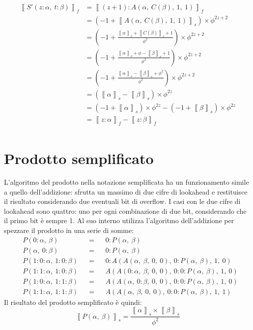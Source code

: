 \documentclass[Lau,oneside]{sapthesis}
\begin{document}
\begin{align*}
\left\llbracket S'(z:\alpha, \ t:\beta) \right\rrbracket_f & = \left\llbracket (z+1):A(\alpha, \ C(\beta), \ 1, \ 1) \right\rrbracket_f\\
& = \left( -1 + \left\llbracket A(\alpha, \ C(\beta), \ 1, \ 1) \right\rrbracket_s \right) \times \phi^{2z+2}\\
& = \left( -1 + \frac{\left\llbracket \alpha \right\rrbracket_s + \left\llbracket C(\beta) \right\rrbracket_s + 1}{\phi^2} \right) \times \phi^{2z+2}\\
& = \left( -1 + \frac{\left\llbracket \alpha \right\rrbracket_s + \phi - \left\llbracket \beta \right\rrbracket_s + 1}{\phi^2} \right) \times \phi^{2z+2}\\
& = \left( -1 + \frac{\left\llbracket \alpha \right\rrbracket_s - \left\llbracket \beta \right\rrbracket_s + \phi^2}{\phi^2} \right) \times \phi^{2z+2}\\
& = \left( \left\llbracket \alpha \right\rrbracket_s - \left\llbracket \beta \right\rrbracket_s \right) \times \phi^{2z}\\
& = \left( -1 + \left\llbracket \alpha \right\rrbracket_s \right) \times \phi^{2z} - \left( -1 + \left\llbracket \beta \right\rrbracket_s \right) \times \phi^{2z}\\
& = \left\llbracket z:\alpha \right\rrbracket_f - \left\llbracket z:\beta \right\rrbracket_f\\
\end{align*}


\section{Prodotto semplificato}
L'algoritmo del prodotto nella notazione semplificata ha un funzionamento simile a quello dell'addizione: sfrutta un massimo di due cifre di lookahead e restituisce il risultato considerando due eventuali bit di overflow. I casi con le due cifre di lookahead sono quattro: uno per ogni combinazione di due bit, considerando che il primo bit è sempre 1. Al suo interno utilizza l'algoritmo dell'addizione per spezzare il prodotto in una serie di somme:
\begin{align*}
&P(0:\alpha, \ \beta) && = && 0:P(\alpha, \ \beta)\\
&P(\alpha, \ 0:\beta) && = && 0:P(\alpha, \ \beta)\\
&P(1:0:\alpha, \ 1:0:\beta) && = && 0:A(A(\alpha, \ \beta, \ 0, \ 0), \ 0:P(\alpha, \ \beta), \ 1, \ 0)\\
&P(1:1:\alpha, \ 1:0:\beta) && = && A(A(0:\alpha, \ \beta, \ 0, \ 0), \ 0:0:P(\alpha, \ \beta), \ 1, \ 0)\\
&P(1:0:\alpha, \ 1:1:\beta) && = && A(A(\alpha, \ 0:\beta, \ 0, \ 0), \ 0:0:P(\alpha, \ \beta), \ 1, \ 0)\\
&P(1:1:\alpha, \ 1:1:\beta) && = && A(A(\alpha, \ \beta, \ 0, \ 0), \ 0:0:P(\alpha, \ \beta), \ 1, \ 1)
\end{align*}
Il risultato del prodotto semplificato è quindi:
$$\left\llbracket P(\alpha, \ \beta) \right\rrbracket_s = \frac{\left\llbracket \alpha \right\rrbracket_s \times \left\llbracket \beta \right\rrbracket_s}{\phi^2}$$
\end{document}
